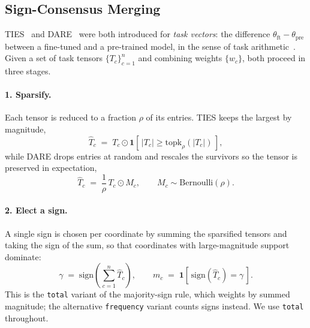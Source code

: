 \subsection{Sign-Consensus Merging}
TIES~\cite{ties} and DARE~\cite{dare} were both introduced for \emph{task vectors}: the difference
$\theta_{\mathrm{ft}} - \theta_{\mathrm{pre}}$ between a fine-tuned and a pre-trained model, in the
sense of task arithmetic~\cite{taskarithmetic}. Given a set of task tensors $\{T_c\}_{c=1}^{n}$ and
combining weights $\{w_c\}$, both proceed in three stages.

\paragraph{1. Sparsify.} Each tensor is reduced to a fraction $\rho$ of its entries. TIES keeps the
largest by magnitude,
%
\begin{equation}
\widehat{T}_c \;=\; T_c \odot \mathbf{1}\!\left[\,\lvert T_c\rvert \geq \mathrm{topk}_{\rho}(\lvert T_c\rvert)\,\right],
\label{eq:trim}
\end{equation}
%
while DARE drops entries at random and rescales the survivors so the tensor is preserved in
expectation,
%
\begin{equation}
\widehat{T}_c \;=\; \frac{1}{\rho}\, T_c \odot M_c , \qquad M_c \sim \mathrm{Bernoulli}(\rho).
\label{eq:dare}
\end{equation}
%
\paragraph{2. Elect a sign.} A single sign is chosen per coordinate by summing the sparsified tensors
and taking the sign of the sum, so that coordinates with large-magnitude support dominate:
%
\begin{equation}
\gamma \;=\; \mathrm{sign}\!\left( \sum_{c=1}^{n} \widehat{T}_c \right),
\qquad
m_c \;=\; \mathbf{1}\!\left[\, \mathrm{sign}(\widehat{T}_c) = \gamma \,\right].
\label{eq:elect}
\end{equation}
%
This is the \texttt{total} variant of the majority-sign rule, which weights by summed magnitude; the
alternative \texttt{frequency} variant counts signs instead. We use \texttt{total} throughout.

